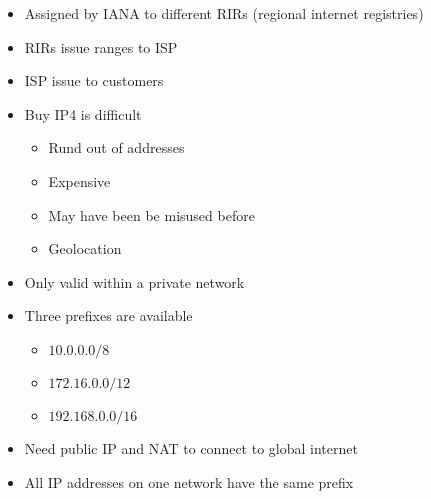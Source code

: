 \begin{itemize}
\begin{itemize}
\begin{itemize}
\begin{itemize}
\begin{itemize}
                                \end{itemize}
                        \end{itemize}
                \end{itemize}
                    \begin{itemize}
                        \item Assigned by IANA to different RIRs (regional internet registries)
                        \item RIRs issue ranges to ISP
                        \item ISP issue to customers
                        \item Buy IP4 is difficult
                            \begin{itemize}
                                \item Rund out of addresses
                                \item Expensive
                                \item May have been be misused before
                                \item Geolocation
                            \end{itemize}
                    \end{itemize}
                    \begin{itemize}
                        \item Only valid within a private network
                        \item Three prefixes are available
                            \begin{itemize}
                                \item $10.0.0.0/8$
                                \item $172.16.0.0/12$
                                \item $192.168.0.0/16$
                            \end{itemize}
                        \item Need public IP and NAT to connect to global internet
                    \end{itemize}
        \end{itemize}
        \begin{itemize}
            \item All IP addresses on one network have the same prefix

\end{itemize}
\end{itemize}
